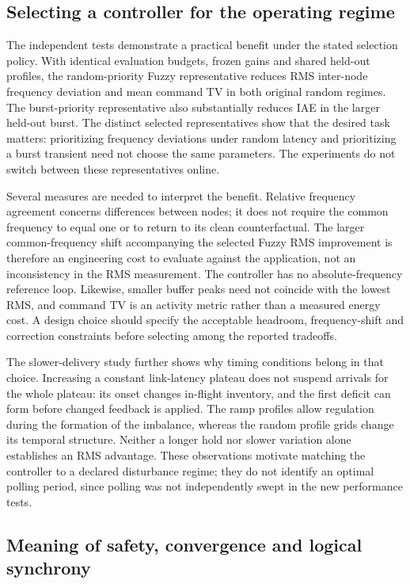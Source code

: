 \subsection{Selecting a controller for the operating regime}
\label{detail:subsec:discussion_selection}

The independent tests demonstrate a practical benefit under the stated
selection policy. With identical evaluation budgets, frozen gains and
shared held-out profiles, the random-priority Fuzzy representative
reduces RMS inter-node frequency deviation and mean command TV in both original random
regimes. The burst-priority representative also substantially reduces
IAE in the larger held-out burst. The distinct selected representatives
show that the desired task matters: prioritizing frequency deviations under random latency
and prioritizing a burst transient need not choose the same parameters.
The experiments do not switch between these representatives online.

Several measures are needed to interpret the benefit. Relative
frequency agreement concerns differences between nodes; it does not
require the common frequency to equal one or to return to its clean
counterfactual. The larger common-frequency shift accompanying the
selected Fuzzy RMS improvement is therefore an engineering cost to
evaluate against the application, not an inconsistency in the RMS
measurement. The controller has no absolute-frequency reference loop.
Likewise, smaller buffer peaks need not coincide with the lowest RMS,
and command TV is an activity metric rather than a measured energy
cost. A design choice should specify the acceptable headroom,
frequency-shift and correction constraints before selecting among the
reported tradeoffs.

The slower-delivery study further shows why timing conditions belong
in that choice. Increasing a constant link-latency plateau does not
suspend arrivals for the whole plateau: its onset changes in-flight
inventory, and the first deficit can form before changed feedback is
applied. The ramp profiles allow regulation during the formation of
the imbalance, whereas the random profile grids change its temporal
structure. Neither a longer hold nor slower variation alone establishes
an RMS advantage. These observations motivate matching the controller
to a declared disturbance regime; they do not identify an optimal
polling period, since polling was not independently swept in the new
performance tests.

\subsection{Meaning of safety, convergence and logical synchrony}
\label{detail:subsec:discussion_scope}

